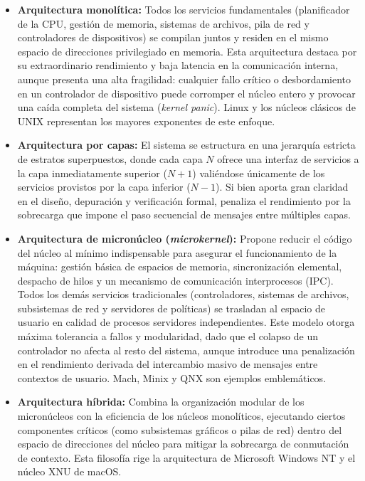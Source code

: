 \documentclass[12pt]{article}
\begin{document}
\begin{itemize}[leftmargin=*]
    \item \textbf{Arquitectura monolítica:} Todos los servicios fundamentales (planificador de la CPU, gestión de memoria, sistemas de archivos, pila de red y controladores de dispositivos) se compilan juntos y residen en el mismo espacio de direcciones privilegiado en memoria. Esta arquitectura destaca por su extraordinario rendimiento y baja latencia en la comunicación interna, aunque presenta una alta fragilidad: cualquier fallo crítico o desbordamiento en un controlador de dispositivo puede corromper el núcleo entero y provocar una caída completa del sistema (\textit{kernel panic}). Linux y los núcleos clásicos de UNIX representan los mayores exponentes de este enfoque.
    \item \textbf{Arquitectura por capas:} El sistema se estructura en una jerarquía estricta de estratos superpuestos, donde cada capa $N$ ofrece una interfaz de servicios a la capa inmediatamente superior ($N+1$) valiéndose únicamente de los servicios provistos por la capa inferior ($N-1$). Si bien aporta gran claridad en el diseño, depuración y verificación formal, penaliza el rendimiento por la sobrecarga que impone el paso secuencial de mensajes entre múltiples capas.
    \item \textbf{Arquitectura de micronúcleo (\textit{microkernel}):} Propone reducir el código del núcleo al mínimo indispensable para asegurar el funcionamiento de la máquina: gestión básica de espacios de memoria, sincronización elemental, despacho de hilos y un mecanismo de comunicación interprocesos (IPC). Todos los demás servicios tradicionales (controladores, sistemas de archivos, subsistemas de red y servidores de políticas) se trasladan al espacio de usuario en calidad de procesos servidores independientes. Este modelo otorga máxima tolerancia a fallos y modularidad, dado que el colapso de un controlador no afecta al resto del sistema, aunque introduce una penalización en el rendimiento derivada del intercambio masivo de mensajes entre contextos de usuario. Mach, Minix y QNX son ejemplos emblemáticos.
    \item \textbf{Arquitectura híbrida:} Combina la organización modular de los micronúcleos con la eficiencia de los núcleos monolíticos, ejecutando ciertos componentes críticos (como subsistemas gráficos o pilas de red) dentro del espacio de direcciones del núcleo para mitigar la sobrecarga de conmutación de contexto. Esta filosofía rige la arquitectura de Microsoft Windows NT y el núcleo XNU de macOS.
\end{itemize}
\end{document}
